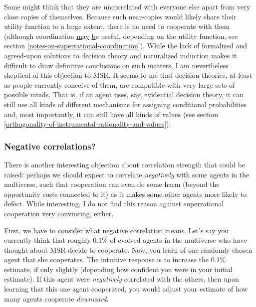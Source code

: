 Some might think that they are uncorrelated with everyone else apart
from very close copies of themselves. Because such near-copies would
likely share their utility function to a large extent, there is no need
to cooperate with them (although coordination
\protect\hyperlink{notes-on-superrational-coordination}{m}a\protect\hyperlink{notes-on-superrational-coordination}{y}
\protect\hyperlink{notes-on-superrational-coordination}{b}e useful,
depending on the utility function, see section
\ref{notes-on-superrational-coordination}). While the lack of formalized and
agreed-upon solutions to decision theory and naturalized induction
\parencite{Soares2014-hg,Soares2015-hu} makes it difficult
to draw definitive conclusions on such matters, I am nevertheless
skeptical of this objection to MSR. It seems to me that decision
theories, at least as people currently conceive of them, are compatible
with very large sets of possible minds. That is, if an agent uses, say,
evidential decision theory, it can still use all kinds of different
mechanisms for assigning conditional probabilities and, most
importantly, it can still have all kinds of values (see section
\ref{orthogonality-of-instrumental-rationality-and-values}).

\hypertarget{negative-correlations}{\subsubsection{Negative
correlations?}\label{negative-correlations}}

There is another interesting objection about correlation strength that
could be raised: perhaps we should expect to correlate \emph{negatively}
with some agents in the multiverse, such that cooperation can even do
some harm (beyond the opportunity costs connected to it) as it makes
some other agents more likely to defect. While interesting, I do not
find this reason against superrational cooperation very convincing,
either.

First, we have to consider what negative correlation means. Let's say
you currently think that roughly 0.1\% of evolved agents in the
multiverse who have thought about MSR decide to cooperate. Now, you
learn of one randomly chosen agent that she cooperates. The intuitive
response is to increase the 0.1\% estimate, if only slightly (depending
how confident you were in your initial estimate). If this agent were
\emph{negatively} correlated with the others, then upon learning that
this one agent cooperated, you would adjust your estimate of how many
agents cooperate \emph{downward}.

